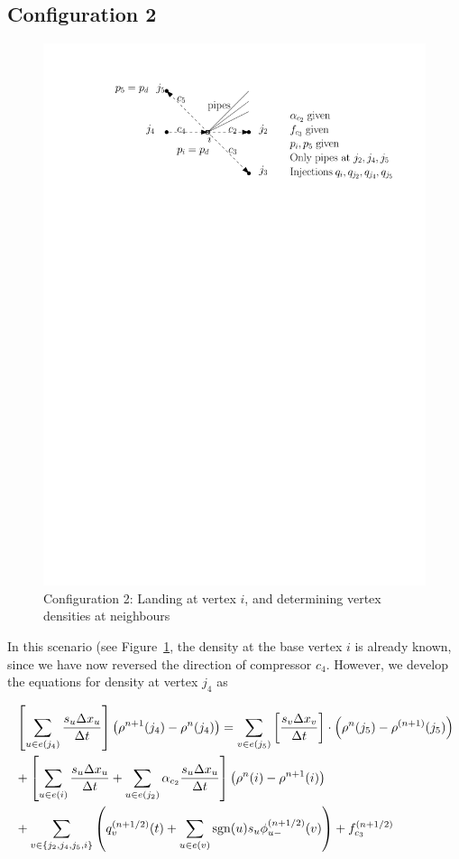\documentclass{amsart}
\DeclareMathOperator{\sgn}{sgn}
\begin{document}
\subsection{Configuration 2}
\begin{figure}
\includegraphics[scale=1]{fig2}
\caption{Configuration 2: Landing at vertex $i$, and determining vertex densities at neighbours}
\label{fig:config2}
\end{figure}

In this scenario (see Figure~\ref{fig:config2}, the density at the base vertex $i$ is already known, since we have now reversed the direction of compressor $c_4$. However, we develop the equations for density at vertex $j_4$ as 

\begin{align}
& \left[ \sum_{u \in e(j_4)}\frac{s_{u} \Delta x_{u}}{\Delta t} \right] \left ( \rho^{n+1}(j_4) - \rho^{n}(j_4) \right)  = \sum_{v \in e(j_5)}\left[\frac{s_{v} \Delta x_{v}}{\Delta t}\right] \cdot \left(\rho^{n}(j_5) - \rho^{(n+1)}(j_5) \right)  \notag \\
& + \left[ \sum_{u \in e(i)}\frac{s_{u} \Delta x_{u}}{\Delta t} + \sum_{u \in e(j_2)}\alpha_{c_2}\frac{s_{u} \Delta x_{u}}{\Delta t} \right]\left( \rho^n(i) - \rho^{n+1}(i) \right) \notag \\
& +\sum_{v \in \{j_2, j_4, j_5, i\}} \left( q^{(n+1/2)}_{v}(t) + \sum_{u \in e(v)}\sgn(u) s_{u} \phi_{u-}^{(n+1/2)}(v) \right) + f^{(n+1/2)}_{c_3}
\label{eqn:config2}
\end{align}
\end{document}
